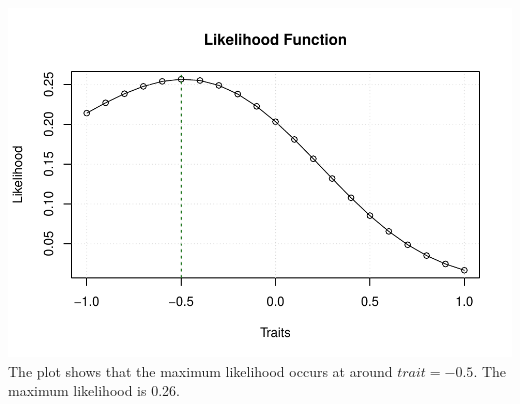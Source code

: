 \documentclass[
]{article}
\begin{document}
\includegraphics{Assignment_2_files/figure-latex/unnamed-chunk-7-1.pdf}
The plot shows that the maximum likelihood occurs at around
\(trait=-0.5\). The maximum likelihood is 0.26.
\end{document}

